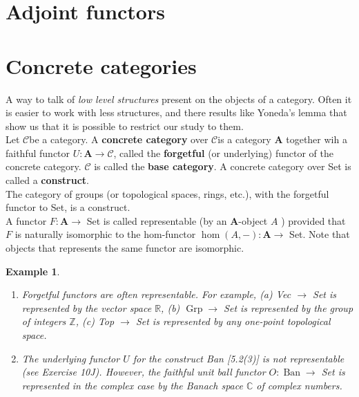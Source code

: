 \documentclass{book}
\newtheorem{example}{Example}
\newcommand{\cc}{$\mathcal{C}$}
\begin{document}
\section{Adjoint functors}







\section{Concrete categories}

A way to talk of \textit{low level structures} present on the objects of a category. Often it is easier to work with less structures, and there results like Yoneda's lemma that show us that it is possible to restrict our study to them.\\

Let \cc be a category. A \textbf{concrete category} over \cc is a category $\mathbf{A}$ together wih a faithful functor $U: \mathbf{A} \rightarrow \mathcal{C}$, called the \textbf{forgetful} (or underlying) functor of the concrete category. $\mathcal{C}$ is called the \textbf{base category}. A concrete category over Set is called a \textbf{construct}.\\
The category of groups (or topological spaces, rings, etc.), with the forgetful functor to Set, is a construct.\\

A functor $F: \mathbf{A} \rightarrow$ Set is called representable (by an $\mathbf{A}$-object $A$ ) provided that $F$ is naturally isomorphic to the hom-functor $\operatorname{hom}(A,-): \mathbf{A} \rightarrow$ Set. Note that objects that represents the same functor are isomorphic.\\

\begin{example}
    \begin{enumerate}
        \item Forgetful functors are often representable. For example,
        (a) Vec $\rightarrow$ Set is represented by the vector space $\mathbb{R}$,
        (b) $\operatorname{Grp} \rightarrow$ Set is represented by the group of integers $\mathbb{Z}$,
        (c) Top $\rightarrow$ Set is represented by any one-point topological space.
        \item The underlying functor $U$ for the construct Ban [5.2(3)] is not representable (see Exercise 10J). However, the faithful unit ball functor $O: \operatorname{Ban} \rightarrow$ Set is represented in the complex case by the Banach space $\mathbb{C}$ of complex numbers.
    \end{enumerate}
\end{example}
\end{document}
